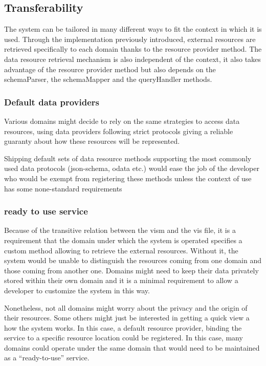 \subsection{Transferability}

The system can be tailored in many different ways to fit the context in which it is used. Through the implementation previously introduced, external resources are retrieved specifically to each domain thanks to the resource provider method. The data resource retrieval mechanism is also independent of the context, it also takes advantage of the resource provider method but also depends on the schemaParser, the schemaMapper and the queryHandler methods.

\subsubsection{Default data providers}
Various domains might decide to rely on the same strategies to access data resources, using data providers following strict protocols giving a reliable guaranty about how these resources will be represented.

Shipping default sets of data resource methods supporting the most commonly used data protocols (json-schema, odata etc.) would ease the job of the developer who would be exempt from registering these methods unless the context of use has some none-standard requirements

\subsubsection{ready to use service}
Because of the transitive relation between the vism and the vis file, it is a requirement that the domain under which the system is operated specifies a custom method allowing to retrieve the external resources. Without it, the system would be unable to distinguish the resources coming from one domain and those coming from another one. Domains might need to keep their data privately stored within their own domain and it is a minimal requirement to allow a developer to customize the system in this way.

Nonetheless, not all domains might worry about the privacy and the origin of their resources. Some others might just be interested in getting a quick view a how the system works. In this case, a default resource provider, binding the service to a specific resource location could be registered. In this case, many domains could operate under the same domain that would need to be maintained as a ``ready-to-use'' service.

